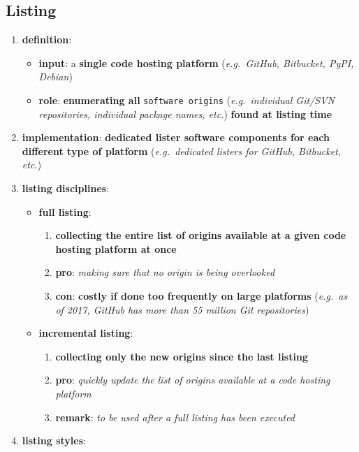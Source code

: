 \documentclass[11pt]{article}
\providecommand{\tightlist}{%
      \setlength{\itemsep}{0pt}\setlength{\parskip}{0pt}}
\begin{document}
\hypertarget{listing}{%
\subsection{Listing}\label{listing}}

\begin{enumerate}
\def\labelenumi{\arabic{enumi}.}
\tightlist
\item
  \textbf{definition}:

  \begin{itemize}
  \tightlist
  \item
    \textbf{input}: a \textbf{single code hosting platform}
    (\emph{e.g.~GitHub, Bitbucket, PyPI, Debian})
  \item
    \textbf{role}: \textbf{enumerating all} \texttt{software\ origins}
    (\emph{e.g.~individual Git/SVN repositories, individual package
    names, etc.}) \textbf{found at listing time}
  \end{itemize}
\item
  \textbf{implementation}: \textbf{dedicated lister software components
  for each different type of platform} (\emph{e.g.~dedicated listers for
  GitHub, Bitbucket, etc.})
\item
  \textbf{listing disciplines}:

  \begin{itemize}
  \tightlist
  \item
    \textbf{full listing}:

    \begin{enumerate}
    \def\labelenumii{\arabic{enumii}.}
    \tightlist
    \item
      \textbf{collecting the entire list of origins available at a given
      code hosting platform at once}
    \item
      \textbf{pro}: \emph{making sure that no origin is being
      overlooked}
    \item
      \textbf{con}: \textbf{costly if done too frequently on large
      platforms} (\emph{e.g.~as of 2017, GitHub has more than 55 million
      Git repositories})
    \end{enumerate}
  \item
    \textbf{incremental listing}:

    \begin{enumerate}
    \def\labelenumii{\arabic{enumii}.}
    \tightlist
    \item
      \textbf{collecting only the new origins since the last listing}
    \item
      \textbf{pro}: \emph{quickly update the list of origins available
      at a code hosting platform}
    \item
      \textbf{remark}: \emph{to be used after a full listing has been
      executed}
    \end{enumerate}
  \end{itemize}
\item
  \textbf{listing styles}:


\end{enumerate}
\end{document}
